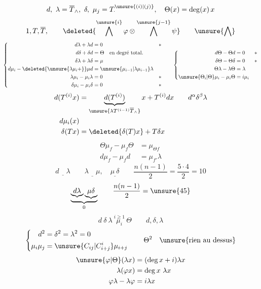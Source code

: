 \[
 d,\ \lambda=\overline T_{\wedge},\ \delta,\ \mu_j=T_{\cdot}^{\unsure{(i)|(j)}},\quad
 \Theta(x)=\deg(x)\,x
\]
\[
 1,T,\overline T,\qquad
 \deleted{\bigwedge^{\unsure{i}}\varphi\otimes\bigwedge^{\unsure{j-1}}\psi}
 \qquad\unsure{\bigwedge}
\]
\[
\left\{\begin{aligned}
 d\lambda+\lambda d&=0 &&*\\
 d\delta+\delta d&=\Theta\quad\text{en degré total}.\\
 \delta\lambda+\lambda\delta&=\mu\\
 d\mu_i-\deleted{\unsure{\lambda\mu_i+}}\mu d&=\unsure{\mu_{i-1}|\lambda\mu_{i-1}}\lambda\\
 \lambda\mu_i-\mu_i\lambda&=0 &&*\\
 \delta\mu_i-\mu_i\delta&=0 &&*
\end{aligned}\right.
\qquad
\left\{\begin{aligned}
 d\Theta-\Theta d&=0 &&*\\
 \delta\Theta-\Theta\delta&=0 &&*\\
 \Theta\lambda-\lambda\Theta&=\lambda\\
 \unsure{\Theta_i|\Theta}\mu_i-\mu_i\Theta&=i\mu_i
\end{aligned}\right.
\]
\[
\begin{aligned}
 d(T^{(i)}x)&=\underbrace{d(T^{(i)})}_{\unsure{\lambda T^{(i-1)}\overline T_{\wedge}}}x+T^{(i)}dx
 \qquad d^\alpha\delta^\beta\lambda\\
 d\mu_i(x)&\\
 \delta(Tx)&=\deleted{\delta(T)x}+T\delta x
\end{aligned}
\]
\[
 \boxed{\begin{aligned}
 \Theta\mu_f-\mu_f\Theta&=\mu_{\Theta f}\\
 d\mu_f-\mu_f d&=\mu_{f'}\lambda
 \end{aligned}}
\]
\[
 \underline{d\quad\lambda}\qquad\underline{\lambda\quad\mu},\quad
 \underline{\mu\ \delta}
 \qquad \frac{n(n-1)}2=\frac{5\cdot4}2=10
\]
\[
 \underbrace{\underbrace{d\lambda}\underbrace{\mu\delta}}_{0}
 \qquad \frac{n(n-1)}2=\unsure{45}
\]
\[
 d\ \delta\ \lambda\ \overset{i\geq1}{\mu_i}\ \Theta\qquad d,\delta,\lambda
\]
\[
 \left\{\begin{aligned}
 d^2&=\delta^2=\lambda^2=0\\
 \mu_i\mu_j&=\unsure{C_{ij}|C^i_{i+j}}\mu_{i+j}
 \end{aligned}\right.\qquad
 \Theta^2\quad\text{\unsure{rien au dessus}}
\]
\[
 \begin{aligned}
 \unsure{\varphi|\Theta}(\lambda x)&=(\deg x+i)\lambda x\\
 \lambda(\varphi x)&=\deg x\ \lambda x\\
 \varphi\lambda-\lambda\varphi&=i\lambda x
 \end{aligned}
\]
